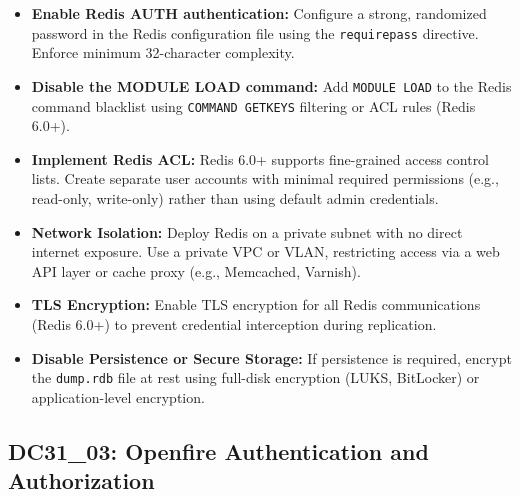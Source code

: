 \documentclass[11pt,a4paper]{article}
\begin{document}
\begin{itemize}
    \item \textbf{Enable Redis AUTH authentication:} Configure a strong, randomized password in the Redis configuration file using the \texttt{requirepass} directive. Enforce minimum 32-character complexity.
    
    \item \textbf{Disable the MODULE LOAD command:} Add \texttt{MODULE LOAD} to the Redis command blacklist using \texttt{COMMAND GETKEYS} filtering or ACL rules (Redis 6.0+).
    
    \item \textbf{Implement Redis ACL:} Redis 6.0+ supports fine-grained access control lists. Create separate user accounts with minimal required permissions (e.g., read-only, write-only) rather than using default admin credentials.
    
    \item \textbf{Network Isolation:} Deploy Redis on a private subnet with no direct internet exposure. Use a private VPC or VLAN, restricting access via a web API layer or cache proxy (e.g., Memcached, Varnish).
    
    \item \textbf{TLS Encryption:} Enable TLS encryption for all Redis communications (Redis 6.0+) to prevent credential interception during replication.
    
    \item \textbf{Disable Persistence or Secure Storage:} If persistence is required, encrypt the \texttt{dump.rdb} file at rest using full-disk encryption (LUKS, BitLocker) or application-level encryption.
\end{itemize}

\subsection{DC31\_03: Openfire Authentication and Authorization}
\end{document}
